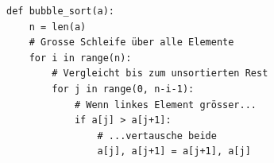 \begin{procedure}[Ablauf]
\end{procedure}
\begin{contentbox}
\begin{factlist}
\end{factlist}
\end{contentbox}
\begin{codebox}
\begin{lstlisting}[style=CodeExpert]
def bubble_sort(a):
    n = len(a)
    # Grosse Schleife über alle Elemente
    for i in range(n):
        # Vergleicht bis zum unsortierten Rest
        for j in range(0, n-i-1):
            # Wenn linkes Element grösser...
            if a[j] > a[j+1]:
                # ...vertausche beide
                a[j], a[j+1] = a[j+1], a[j]
\end{lstlisting}
\end{codebox}

